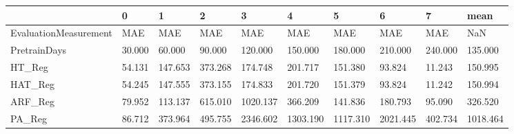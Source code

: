 \begin{tabular}{llllllllll}
\toprule
{} &      0 &       1 &       2 &        3 &        4 &        5 &        6 &       7 &     mean \\
\midrule
EvaluationMeasurement &    MAE &     MAE &     MAE &      MAE &      MAE &      MAE &      MAE &     MAE &      NaN \\
PretrainDays          & 30.000 &  60.000 &  90.000 &  120.000 &  150.000 &  180.000 &  210.000 & 240.000 &  135.000 \\
HT\_Reg                & 54.131 & 147.653 & 373.268 &  174.748 &  201.717 &  151.380 &   93.824 &  11.243 &  150.995 \\
HAT\_Reg               & 54.245 & 147.555 & 373.155 &  174.833 &  201.720 &  151.379 &   93.824 &  11.242 &  150.994 \\
ARF\_Reg               & 79.952 & 113.137 & 615.010 & 1020.137 &  366.209 &  141.836 &  180.793 &  95.090 &  326.520 \\
PA\_Reg                & 86.712 & 373.964 & 495.755 & 2346.602 & 1303.190 & 1117.310 & 2021.445 & 402.734 & 1018.464 \\
\bottomrule
\end{tabular}
